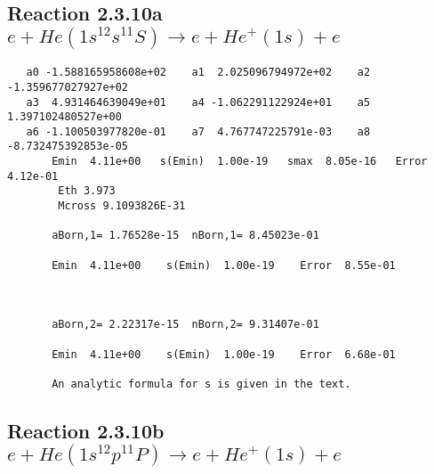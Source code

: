 \documentclass[12pt,dvipdfm]{article}
\begin{document}
\newpage
\subsection{
Reaction 2.3.10a $ e + He(1s^12s^11S) \rightarrow e + He^+(1s) + e$}





\begin{small}\begin{verbatim}
   a0 -1.588165958608e+02    a1  2.025096794972e+02    a2 -1.359677027927e+02
   a3  4.931464639049e+01    a4 -1.062291122924e+01    a5  1.397102480527e+00
   a6 -1.100503977820e-01    a7  4.767747225791e-03    a8 -8.732475392853e-05
       Emin  4.11e+00   s(Emin)  1.00e-19   smax  8.05e-16   Error  4.12e-01
        Eth 3.973
        Mcross 9.1093826E-31

       aBorn,1= 1.76528e-15  nBorn,1= 8.45023e-01

       Emin  4.11e+00    s(Emin)  1.00e-19    Error  8.55e-01



       aBorn,2= 2.22317e-15  nBorn,2= 9.31407e-01

       Emin  4.11e+00    s(Emin)  1.00e-19    Error  6.68e-01

       An analytic formula for s is given in the text.
\end{verbatim}\end{small}







\newpage
\subsection{
Reaction 2.3.10b $e + He(1s^12p^11P) \rightarrow e + He^+(1s) + e$}






\end{document}
